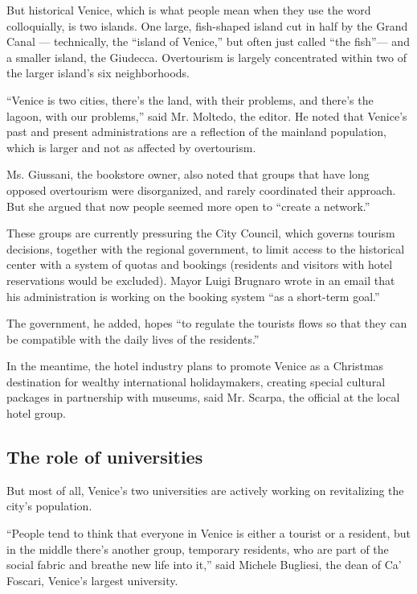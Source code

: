 But historical Venice, which is what people mean when they use the word
colloquially, is two islands. One large, fish-shaped island cut in half
by the Grand Canal --- technically, the ``island of Venice,'' but often
just called ``the fish''--- and a smaller island, the Giudecca.
Overtourism is largely concentrated within two of the larger island's
six neighborhoods.

``Venice is two cities, there's the land, with their problems, and
there's the lagoon, with our problems,'' said Mr. Moltedo, the editor.
He noted that Venice's past and present administrations are a reflection
of the mainland population, which is larger and not as affected by
overtourism.

Ms. Giussani, the bookstore owner, also noted that groups that have long
opposed overtourism were disorganized, and rarely coordinated their
approach. But she argued that now people seemed more open to ``create a
network.''

These groups are currently pressuring the City Council, which governs
tourism decisions, together with the regional government, to limit
access to the historical center with a system of quotas and bookings
(residents and visitors with hotel reservations would be excluded).
Mayor Luigi Brugnaro wrote in an email that his administration is
working on the booking system ``as a short-term goal.''

The government, he added, hopes ``to regulate the tourists flows so that
they can be compatible with the daily lives of the residents.''

In the meantime, the hotel industry plans to promote Venice as a
Christmas destination for wealthy international holidaymakers, creating
special cultural packages in partnership with museums, said Mr. Scarpa,
the official at the local hotel group.

\hypertarget{the-role-of-universities}{%
\subsection{The role of universities}\label{the-role-of-universities}}

But most of all, Venice's two universities are actively working on
revitalizing the city's population.

``People tend to think that everyone in Venice is either a tourist or a
resident, but in the middle there's another group, temporary residents,
who are part of the social fabric and breathe new life into it,'' said
Michele Bugliesi, the dean of Ca' Foscari, Venice's largest university.

